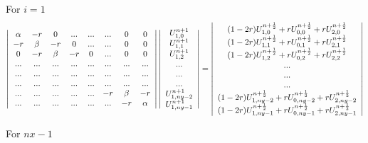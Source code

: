 For $i=1$ 
\[
\left| 
\begin{array}{ccc ccccc}
\alpha & -r      & 0     & ...  & ...  & ...  & 0       & 0      \\
-r     & \beta   & -r    & 0    & ...  & ...  & 0       & 0      \\
0      &  -r     &\beta  & -r   & 0    & ...  & 0       & 0      \\
...    & ...     & ...   & ...  & ...  & ...  & ...     & ...    \\
...    & ...     & ...   & ...  & ...  & ...  & ...     & ...    \\
...    & ...     & ...   & ...  & ...  & ...  & ...     & ...    \\
...    & ...     & ...   & ...  & ...  & -r   & \beta   & -r     \\
...    & ...     & ...   & ...  & ...  & ...  & -r      & \alpha \\
\end{array} 
\right|
\left| 
\begin{array}{c}
U_{1,0}^{n+1} \\
U_{1,1}^{n+1} \\
U_{1,2}^{n+1} \\
...\\
...\\
...\\
U_{1,ny-2}^{n+1} \\
U_{1,ny-1}^{n+1} \\
\end{array} 
\right|
=
\left| 
\begin{array}{c}
(1-2r)U_{1,0}^{n+\frac{1}{2}} + rU_{0,0}^{n+\frac{1}{2}} + rU_{2,0}^{n+\frac{1}{2}}\\
(1-2r)U_{1,1}^{n+\frac{1}{2}} + rU_{0,1}^{n+\frac{1}{2}} + rU_{2,1}^{n+\frac{1}{2}}\\
(1-2r)U_{1,2}^{n+\frac{1}{2}} + rU_{0,2}^{n+\frac{1}{2}} + rU_{2,2}^{n+\frac{1}{2}}\\
...\\
...\\
...\\
(1-2r)U_{1,ny-2}^{n+\frac{1}{2}} + rU_{0,ny-2}^{n+\frac{1}{2}} + rU_{2,ny-2}^{n+\frac{1}{2}}\\
(1-2r)U_{1,ny-1}^{n+\frac{1}{2}} + rU_{0,ny-1}^{n+\frac{1}{2}} + rU_{2,ny-1}^{n+\frac{1}{2}}\\
\end{array} 
\right|
\]

For $nx-1$

